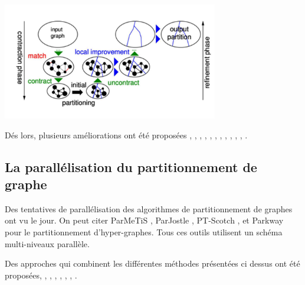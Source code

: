 	\begin{center}
		\includegraphics[height=2in]{img/multiniveaupartitionnement.PNG}		
		 \label{pmn}
	\end{center}
Dés lors, plusieurs améliorations ont été proposées \citep{Aurora2007}, \citep{ChevalierSafro2009}, \citep{KalayciBattiti2018}, \citep{Karypis2003}, \citep{KarypisKumar1998}, \citep{Monien2000}, \citep{Pellegrini1995}, \citep{Pope2016}, \citep{Predari2017}, \citep{Safro2015}, \citep{SandersSchulz2011}, \citep{Talu2017}.


\subsection*{La parallélisation du partitionnement de graphe}
Des tentatives de parallélisation des algorithmes de partitionnement de graphes ont vu le jour. On peut citer ParMeTiS \citep{Karypis2011}, ParJostle \citep{Walshaw2012}, PT-Scotch \citep{ChevalierPellegrini2008}, et Parkway \citep{TrifunovicKnottenbelt2004} pour le partitionnement d'hyper-graphes. Tous ces outils utilisent un schéma multi-niveaux parallèle.

Des approches qui combinent les différentes méthodes présentées ci dessus ont été proposées, \citep{Chan2016}, \citep{LaSalleKarypis2013}, \citep{LaSalleKarypis2015}, \citep{LengYu2007}, \citep{Rahimian2013}, \citep{SandersSchulz2012}, \citep{Tashkova2011}.


